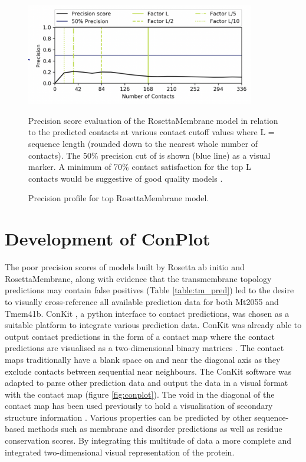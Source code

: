 \begin{figure}[th!]
    \centering
    \includegraphics[width=100mm, scale =0.5]{Results/5lil_precision_fig.png}
    \caption{Precision profile for top RosettaMembrane model.}
    \label{fig:5lil_prec}
    \small
    Precision score evaluation of the RosettaMembrane model in relation to the predicted contacts at various contact cutoff values where L = sequence length (rounded down to the nearest whole number of contacts). The 50\% precision cut of is shown (blue line) as a visual marker. A minimum of 70\% contact satisfaction for the top L contacts would be suggestive of good quality models \cite{de2017comparing}.
\end{figure}

\newpage
\section{Development of ConPlot}
The poor precision scores of models built by Rosetta ab initio and RosettaMembrane, along with evidence that the transmembrane topology predictions may contain false positives (Table \ref{table:tm_pred}) led to the desire to visually cross-reference all available prediction data for both Mt2055 and Tmem41b. ConKit \cite{conkit2017}, a python interface to contact predictions, was chosen as a suitable platform to integrate various prediction data. ConKit was already able to output contact predictions in the form of a contact map where the contact predictions are visualised as a two-dimensional binary matrices \cite{godzik1993regularities}.  The contact maps traditionally have a blank space on and near the diagonal axis as they exclude contacts between sequential near neighbours. The ConKit software was adapted to parse other prediction data and output the data in a visual format with the contact map (figure \ref{fig:conplot}). The void in the diagonal of the contact map has been used previously to hold a visualisation of secondary structure information \cite{taylor2016algorithm}.  Various properties can be predicted by other sequence-based methods such as membrane and disorder predictions as well as residue conservation scores.  By integrating this multitude of data a more complete and integrated two-dimensional visual representation of the protein. \\

